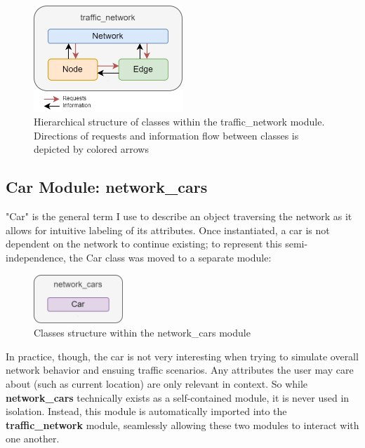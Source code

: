 \begin{figure}[H]
    \centering
	\includegraphics[width=0.5\textwidth]{tex files/Figures/traffic_network_module.png}
	\caption[Network Module:  traffic\_network]{Hierarchical structure of classes within the traffic\_network module.  Directions of requests and information flow between classes is depicted by colored arrows }
	\label{fig:network_module}
\end{figure}


\subsection{Car Module:  network\_cars}

\par "Car" is the general term I use to describe an object traversing the network as it allows for intuitive labeling of its attributes.  Once instantiated, a car is not dependent on the network to continue existing; to represent this semi-independence, the Car class was moved to a separate module:

\begin{figure}[H]
    \centering
	\includegraphics[width=0.3\textwidth]{tex files/Figures/car_module.png}
	\caption[Car Module:  network\_cars]{Classes structure within the network\_cars module}
	\label{fig:cars_module}
\end{figure}

\par In practice, though, the car is not very interesting when trying to simulate overall network behavior and ensuing traffic scenarios.  Any attributes the user may care about (such as current location) are only relevant in context.  So while \textbf{network\_cars} technically exists as a self-contained module, it is never used in isolation.  Instead, this module is automatically imported into the \textbf{traffic\_network} module, seamlessly allowing these two modules to interact with one another.


